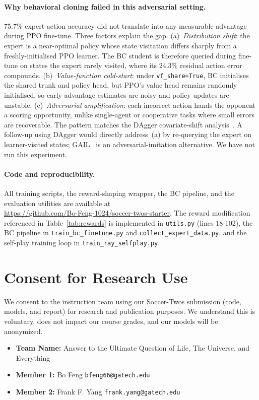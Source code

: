\documentclass{article}
\begin{document}
\paragraph{Why behavioral cloning failed in this adversarial setting.}
75.7\% expert-action accuracy did not translate into any measurable advantage
during PPO fine-tune. Three factors explain the gap. (a)~\emph{Distribution
shift}: the expert is a near-optimal policy whose state visitation differs
sharply from a freshly-initialised PPO learner. The BC student is therefore
queried during fine-tune on states the expert rarely visited, where its 24.3\%
residual action error compounds. (b)~\emph{Value-function cold-start}: under \texttt{vf\_share=True}, BC
initialises the shared trunk and policy head, but PPO's value head remains
randomly initialised, so early advantage estimates are noisy and policy
updates are unstable.
(c)~\emph{Adversarial amplification}: each incorrect action hands the opponent
a scoring opportunity, unlike single-agent or cooperative tasks where small
errors are recoverable. The pattern matches the DAgger covariate-shift
analysis~\citep{ross2011dagger}. A follow-up using DAgger would directly
address~(a) by re-querying the expert on learner-visited states;
GAIL~\citep{ho2016gail} is an adversarial-imitation alternative. We have not
run this experiment.

\paragraph{Code and reproducibility.}
All training scripts, the reward-shaping wrapper, the BC pipeline, and the
evaluation utilities are available at\\
\url{https://github.com/Bo-Feng-1024/soccer-twos-starter}. The reward modification
referenced in Table~\ref{tab:rewards} is implemented in
\texttt{utils.py} (lines 18-102), the BC pipeline in
\texttt{train\_bc\_finetune.py} and \texttt{collect\_expert\_data.py}, and the
self-play training loop in \texttt{train\_ray\_selfplay.py}.



\section*{Consent for Research Use}

We consent to the instruction team using our Soccer-Twos submission (code, models, and report) for research and publication purposes. We understand this is voluntary, does not impact our course grades, and our models will be anonymized.

\begin{itemize}
\item \textbf{Team Name:} Answer to the Ultimate Question of Life, The Universe, and Everything
\item \textbf{Member 1:} Bo Feng \textbar{} \texttt{bfeng66@gatech.edu}
\item \textbf{Member 2:} Frank F. Yang \textbar{} \texttt{frank.yang@gatech.edu}
\end{itemize}
\end{document}
